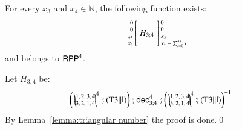
\begin{lemma}
\label{lemma:The kernel kCU  to define CU}
    For every $ x_3 $ and $ x_4 \in\mathbb{N}$, the following function exists:
    \begin{align*}
    \arraycolsep=1.4pt
    \begin{array}{rcl}
    \left. {\scriptsize 
    	\begin{array}{r} 
    	0\\ 0\\ x_3\\ x_4\\ 
    	\end{array}} 
    \right[
    & H_{3;4} &
    \left] {\scriptsize 
    	\begin{array}{l}
    	0\\ 0\\ x_3\\ x_4 - \sum_{i=0}^{x_3} i
    	\end{array} } \right.
    \end{array}
    \end{align*}
	and belongs to $ \mathsf{RPP}^4 $.
\end{lemma}
\begin{prf}
Let $ H_{3;4} $ be:
	\begin{align*}
	& \left (\rprSwap{4}{1,2,3,4}{3,2,1,4} 
	\rprSeq (\rprPCom{\operatorname{T3}}{\rprId})\right )
	\rprSeq \rprDec^{4}_{3;4}
	\rprSeq \rprInv{\left (\rprSwap{4}{1,2,3,4}{3,2,1,4}
		    \rprSeq (\rprPCom{\operatorname{T3}}{\rprId})\right )}
	\enspace .
	\end{align*}
By Lemma~\ref{lemma:triangular number} the proof is done.\qed
\end{prf}

